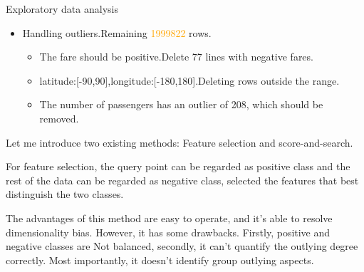 \documentclass[
 size=14pt,
 paper=smartboard,  %
 mode=present, 		%
 display=slides, 	%
 style=tuliplab,  	%
 pauseslide,
 fleqn,leqno]{powerdot}
\begin{document}
\begin{slide}{Exploratory data analysis}
\begin{itemize}
  \item
  Handling outliers.Remaining \textcolor{orange}{1999822} rows.

  \begin{itemize}
    \item
    The fare should be positive.Delete 77 lines with negative fares.
    \item
    latitude:[-90,90],longitude:[-180,180].Deleting rows outside the range.
    \item
    The number of passengers has an outlier of 208, which should be removed.
  \end{itemize}
\end{itemize}

\begin{note}
Let me introduce two existing methods:
Feature selection and score-and-search.

For feature selection,
the query point can be regarded as positive class and
the rest of the data can be regarded as negative class,
selected the features that best distinguish the two classes.

The advantages of this method are easy to operate,
and it's able to resolve dimensionality bias.
However, it has some drawbacks.
Firstly,
positive and negative classes are Not balanced,
secondly,
it can't quantify the outlying degree correctly.
Most importantly,
it doesn't identify group outlying aspects.
\end{note}

\end{slide}
\end{document}
